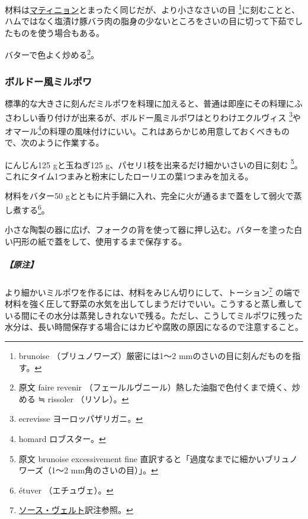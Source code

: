 \begin{recette}

 

材料は\protect\hyperlink{matignon}{マティニョン}とまったく同じだが、より小さなさいの目
\footnote{brunoise （ブリュノワーズ）厳密には1〜2
  mmのさいの目に刻んだものを指す。}に刻むことと、ハムではなく塩漬け豚バラ肉の脂身の少ないところをさいの目に切って下茹でしたものを使う場合もある。

バターで色よく炒める\footnote{原文 faire revenir
  （フェールルヴニール）熱した油脂で色付くまで焼く、炒める ≒ rissoler
  （リソレ）。}。

\atoaki{}

\hypertarget{mirepoix-fine}{%
\subsubsection{ボルドー風ミルポワ}\label{mirepoix-fine}}



標準的な大きさに刻んだミルポワを料理に加えると、普通は即座にその料理にふさわしい香り付けが出来るが、ボルドー風ミルポワはとりわけエクルヴィス
\footnote{ecrevisse ヨーロッパザリガニ。}やオマール\footnote{homard
  ロブスター。}の料理の風味付けにいい。これはあらかじめ用意しておくべきもので、次のように作業する。

にんじん125 gと玉ねぎ125 g、パセリ1枝を出来るだけ細かいさいの目に刻む
\footnote{原文 brunoise excessivement fine
  直訳すると「過度なまでに細かいブリュノワーズ（1〜2
  mm角のさいの目）」。}。これにタイム1つまみと粉末にしたローリエの葉1つまみを加える。

材料をバター50
gとともに片手鍋に入れ、完全に火が通るまで蓋をして弱火で蒸し煮する\footnote{étuver
  （エチュヴェ）。}。

小さな陶製の器に広げ、フォークの背を使って器に押し込む。バターを塗った白い円形の紙で蓋をして、使用するまで保存する。

\hypertarget{nota-mirepoix-fine}{%
\subparagraph{【原注】}\label{nota-mirepoix-fine}}

より細かいミルポワを作るには、材料をみじん切りにして、トーション\footnote{\protect\hyperlink{sauce-verte}{ソース・ヴェルト}訳注参照。}
の端で材料を強く圧して野菜の水気を出してしまうだけでいい。こうすると蒸し煮している間にその水分は蒸発しきれないで残る。ただし、こうしてミルポワに残った水分は、長い時間保存する場合にはカビや腐敗の原因になるので注意すること。


\end{recette}
